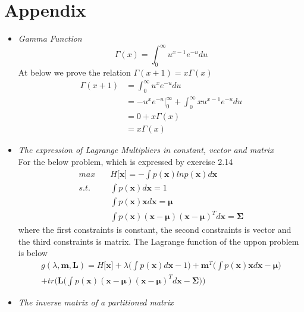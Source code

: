 \documentclass[12pt, a4paper]{article}
\begin{document}
    \section{Appendix}
    \begin{itemize}
        \item \textit{Gamma Function}
        \begin{equation}
            \label{GammaFunction}
            \Gamma(x)=\int_0^\infty u^{x-1}e^{-u}du
        \end{equation}
        At below we prove the relation $\Gamma(x+1)=x\Gamma(x)$
        \begin{align*}
            \Gamma(x+1)&=\int_0^\infty u^xe^{-u}du\\
            &=-u^xe^{-u}\Big\vert_0^\infty+\int_0^\infty xu^{x-1}e^{-u}du\\
            &=0+x\Gamma(x)\\
            &=x\Gamma(x)
        \end{align*}
        \item \textit{The expression of Lagrange Multipliers in constant, vector and matrix}\\
        For the below problem, which is expressed by exercise 2.14
        \begin{align*}
            max\quad &H\lbrack\bm{x}\rbrack=-\int p(\bm{x})lnp(\bm{x})d\bm{x}\\
            s.t.\quad &\int p(\bm{x})d\bm{x}=1\\
            &\int p(\bm{x})\bm{x}d\bm{x}=\bm{\mu}\\
            &\int p(\bm{x})(\bm{x}-\bm{\mu})(\bm{x}-\bm{\mu})^Td\bm{x}=\bm{\Sigma}
        \end{align*}
        where the first constraints is constant, the second constraints is vector and the third 
        constraints is matrix. The Lagrange function of the uppon problem is below
        \begin{align}
            g(\lambda,\bm{m},\bm{L})=H\lbrack\bm{x}\rbrack+\lambda\Big(\int p(\bm{x})d\bm{x}-1
            \Big)+\bm{m}^T\Big(\int p(\bm{x})\bm{x}d\bm{x}-\bm{\mu}\Big)\nonumber\\
            +tr\Big(\bm{L}\big(\int p(\bm{x})(\bm{x}
            -\bm{\mu})(\bm{x}-\bm{\mu})^Td\bm{x}-\bm{\Sigma}\big)\Big)
        \end{align}
        \item \textit{The inverse matrix of a partitioned matrix}
        \begin{equation}
            \label{Eq:InvOfPartitionedMatrix}

\end{equation}
\end{itemize}
\end{document}
